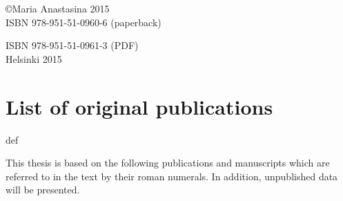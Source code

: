 \documentclass[a4paper,12pt]{article} %
\providecommand{\phantomsection}{def} %
\begin{document}
\begin{singlespace}
\vspace{1.5 cm}

\copyright Maria Anastasina 2015 \\


ISBN 978-951-51-0960-6  (paperback)

ISBN 978-951-51-0961-3 (PDF) \\

Helsinki 2015
\end{singlespace}



\cleardoublepage
{}
\tableofcontents
\cleardoublepage
{}


\section*{List of original publications}
\phantomsection %

This thesis is based on the following publications and manuscripts which are referred to in the text by their roman numerals. In addition, unpublished data will be presented.
\end{document}
